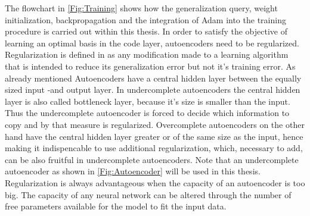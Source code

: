 The flowchart in \cref{Fig:Training} shows how the generalization query, weight initialization, backpropagation and the integration of Adam into the training procedure is carried out within this thesis.
In order to satisfy the objective of learning an optimal basis in the code layer, autoencoders need to be regularized. Regularization is defined in \cite{Goodfellow} as any modification made to a learning algorithm that is intended to reduce its generalization error but not it's training error. As already mentioned Autoencoders have a central hidden layer between the equally sized input -and output layer. In undercomplete autoencoders the central hidden layer is also called bottleneck layer, because it's size is smaller than the input. Thus the undercomplete autoencoder is forced to decide which information to copy and by that measure is regularized. Overcomplete autoencoders on the other hand have the central hidden layer greater or of the same size as the input, hence making it indispencable to use additional regularization, which, necessary to add, can be also fruitful in undercomplete autoencoders. Note that an undercomplete autoencoder as shown in \cref{Fig:Autoencoder} will be used in this thesis. Regularization is always advantageous when the capacity of an autoencoder is too big. The capacity of any neural network can be altered through the number of free parameters available for the model to fit the input data.\\

